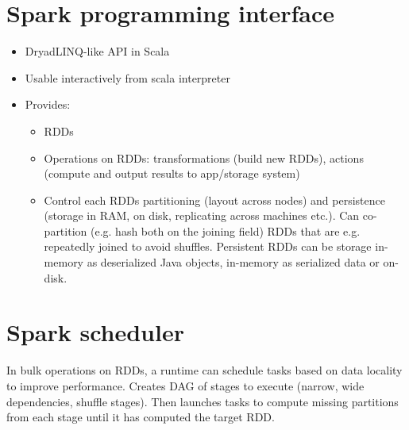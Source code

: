 \section{Spark programming interface}
\begin{itemize}
    \item DryadLINQ-like API in Scala
    \item Usable interactively from scala interpreter
    \item Provides:
    \begin{itemize}
        \item RDDs
        \item Operations on RDDs: transformations (build new RDDs), actions (compute and output results to app/storage system)
        \item Control each RDDs partitioning (layout across nodes) and persistence (storage in RAM, on disk, replicating across machines etc.). Can co-partition (e.g. hash both on the joining field) RDDs that are e.g. repeatedly joined to avoid shuffles. Persistent RDDs can be storage in-memory as deserialized Java objects, in-memory as serialized data or on-disk. 
        
    \end{itemize}
    
\end{itemize}

\section{Spark scheduler}
In bulk operations on RDDs, a runtime can schedule tasks based on data locality to improve performance.
Creates DAG of stages to execute (narrow, wide dependencies, shuffle stages). Then launches tasks to compute missing partitions from each stage until it has computed the target RDD.